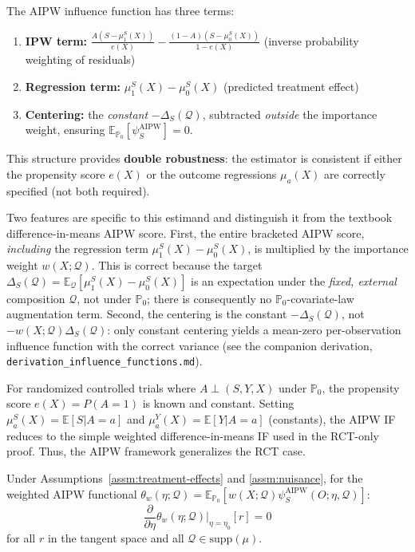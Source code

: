 \begin{remark}
The AIPW influence function has three terms:
\begin{enumerate}
\item \textbf{IPW term:} $\frac{A(S - \mu_1^S(X))}{e(X)} - \frac{(1-A)(S - \mu_0^S(X))}{1-e(X)}$ (inverse probability weighting of residuals)
\item \textbf{Regression term:} $\mu_1^S(X) - \mu_0^S(X)$ (predicted treatment effect)
\item \textbf{Centering:} the \emph{constant} $-\Delta_S(\mathcal{Q})$, subtracted \emph{outside} the importance weight, ensuring $\mathbb{E}_{\mathbb{P}_0}[\psi_S^{\text{AIPW}}] = 0$.
\end{enumerate}
This structure provides \textbf{double robustness}: the estimator is consistent if either the propensity score $e(X)$ or the outcome regressions $\mu_a(X)$ are correctly specified (not both required).

Two features are specific to this estimand and distinguish it from the textbook difference-in-means AIPW score. First, the entire bracketed AIPW score, \emph{including} the regression term $\mu_1^S(X) - \mu_0^S(X)$, is multiplied by the importance weight $w(X;\mathcal{Q})$. This is correct because the target $\Delta_S(\mathcal{Q}) = \mathbb{E}_{\mathcal{Q}}[\mu_1^S(X) - \mu_0^S(X)]$ is an expectation under the \emph{fixed, external} composition $\mathcal{Q}$, not under $\mathbb{P}_0$; there is consequently no $\mathbb{P}_0$-covariate-law augmentation term. Second, the centering is the constant $-\Delta_S(\mathcal{Q})$, not $-w(X;\mathcal{Q})\Delta_S(\mathcal{Q})$: only constant centering yields a mean-zero per-observation influence function with the correct variance (see the companion derivation, \texttt{derivation\_influence\_functions.md}).
\end{remark}

\begin{remark}
For randomized controlled trials where $A \perp (S, Y, X)$ under $\mathbb{P}_0$, the propensity score $e(X) = P(A=1)$ is known and constant. Setting $\mu_a^S(X) = \mathbb{E}[S|A=a]$ and $\mu_a^Y(X) = \mathbb{E}[Y|A=a]$ (constants), the AIPW IF reduces to the simple weighted difference-in-means IF used in the RCT-only proof. Thus, the AIPW framework generalizes the RCT case.
\end{remark}

\begin{lemma}
\label{lem:orthogonality}
Under Assumptions~\ref{assm:treatment-effects} and \ref{assm:nuisance}, for the weighted AIPW functional $\theta_w(\eta; \mathcal{Q}) = \mathbb{E}_{\mathbb{P}_0}[w(X; \mathcal{Q}) \psi_S^{\text{AIPW}}(O; \eta, \mathcal{Q})]$:
\begin{equation}
\frac{\partial}{\partial\eta}\theta_w(\eta; \mathcal{Q})\bigg|_{\eta = \eta_0}[r] = 0
\end{equation}
for all $r$ in the tangent space and all $\mathcal{Q} \in \text{supp}(\mu)$.
\end{lemma}

